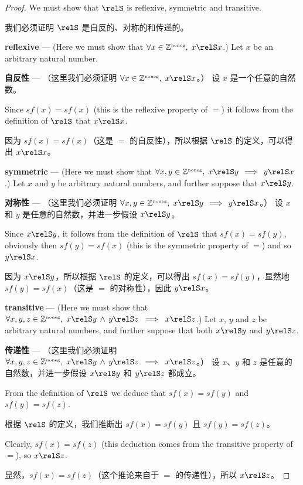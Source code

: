 \begin{proof}
We must show that $\relS$ is reflexive, symmetric and transitive.

我们必须证明 $\relS$ 是自反的、对称的和传递的。

{\bf reflexive} --- (Here we must show that $\forall x \in \Naturals, \; x \relS x$.)
Let $x$ be an arbitrary natural number.

{\bf 自反性} --- （这里我们必须证明 $\forall x \in \Naturals, \; x \relS x$。）
设 $x$ 是一个任意的自然数。

Since $sf(x) = sf(x)$ (this is the reflexive 
property of $=$) it follows from the definition of $\relS$ that $x \relS x$.

因为 $sf(x) = sf(x)$（这是 $=$ 的自反性），所以根据 $\relS$ 的定义，可以得出 $x \relS x$。

{\bf symmetric} --- (Here we must show that  $\forall x,y \in \Naturals, \; x \relS y \, 
\implies \, y \relS x$.)
Let $x$ and $y$ be arbitrary natural numbers, and further suppose that $x \relS y$.

{\bf 对称性} --- （这里我们必须证明 $\forall x,y \in \Naturals, \; x \relS y \, \implies \, y \relS x$。）
设 $x$ 和 $y$ 是任意的自然数，并进一步假设 $x \relS y$。

Since $x \relS y$, it follows from the definition of $\relS$ that $sf(x) = sf(y)$,
obviously then $sf(y) = sf(x)$ (this is the symmetric property of $=$) and so 
$y \relS x$.

因为 $x \relS y$，所以根据 $\relS$ 的定义，可以得出 $sf(x) = sf(y)$，显然地 $sf(y) = sf(x)$（这是 $=$ 的对称性），因此 $y \relS x$。

{\bf transitive} --- (Here we must show that  $\forall x,y,z \in \Naturals, \; x \relS y \,
\land \, y \relS z \; \implies \; x \relS z$.)
Let $x$, $y$ and $z$ be arbitrary natural numbers, and further suppose that both 
$x \relS y$ and $y \relS z$.

{\bf 传递性} --- （这里我们必须证明 $\forall x,y,z \in \Naturals, \; x \relS y \, \land \, y \relS z \; \implies \; x \relS z$。）
设 $x$、$y$ 和 $z$ 是任意的自然数，并进一步假设 $x \relS y$ 和 $y \relS z$ 都成立。

From the definition of $\relS$ we deduce that 
$sf(x) = sf(y)$ and $sf(y) = sf(z)$.

根据 $\relS$ 的定义，我们推断出 $sf(x) = sf(y)$ 且 $sf(y) = sf(z)$。

Clearly, $sf(x) = sf(z)$ (this deduction comes
from the transitive property of $=$), so $x \relS z$.


显然，$sf(x) = sf(z)$（这个推论来自于 $=$ 的传递性），所以 $x \relS z$。
\end{proof}
 
